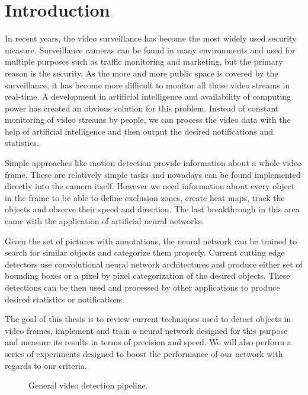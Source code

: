 \chapter*{Introduction}

In recent years, the video surveillance has become the most widely used security measure. Surveillance cameras can be found in many environments and used for multiple purposes such as traffic monitoring and marketing, but the primary reason is the security. As the more and more public space is covered by the surveillance, it has become more difficult to monitor all those video streams in real-time. A development in artificial intelligence and availability of computing power has created an obvious solution for this problem. Instead of constant monitoring of video streams by people, we can process the video data with the help of artificial intelligence and then output the desired notifications and statistics. 

Simple approaches like motion detection provide information about a whole video frame. These are relatively simple tasks and nowadays can be found implemented directly into the camera itself. However we need information about every object in the frame to be able to define exclusion zones, create heat maps, track the objects and observe their speed and direction. The last breakthrough in this area came with the application of artificial neural networks.

Given the set of pictures with annotations, the neural network can be trained to search for similar objects and categorize them properly. Current cutting edge detectors use convolutional neural network architectures and produce either set of bounding boxes or a pixel by pixel categorization of the desired objects. These detections can be then used and processed by other applications to produce desired statistics or notifications. 

The goal of this thesis is to review current techniques used to detect objects in video frames, implement and train a neural network designed for this purpose and measure its results in terms of precision and speed. We will also perform a series of experiments designed to boost the performance of our network with regards to our criteria. 


\begin{figure}
    \centering
    \pipeline
    \caption[General video detection pipeline]%
    {General video detection pipeline.}
    \label{fig:pipeline}
\end{figure}

